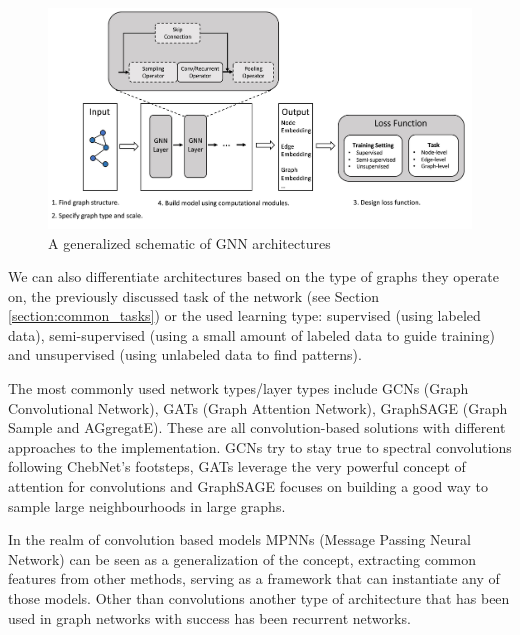 	 \begin{figure}[!h]
	 	\centering
	 	\includegraphics[width=\textwidth]{figures/gnn_general_structure.jpg}
	 	\caption{A generalized schematic of GNN architectures \cite{gnn_review}}
	 \end{figure}
	 
	 We can also differentiate architectures based on the type of graphs they operate on, the previously discussed task of the network (see Section \ref{section:common_tasks}) or the used learning type: supervised (using labeled data), semi-supervised (using a small amount of labeled data to guide training) and unsupervised (using unlabeled data to find patterns).
	 
	 The most commonly used network types/layer types include GCNs\cite{kipf2016semi} (Graph Convolutional Network), GATs\cite{gat_paper} (Graph Attention Network), GraphSAGE\cite{graphasge_paper} (Graph Sample and AGgregatE). These are all convolution-based solutions with different approaches to the implementation. GCNs try to stay true to spectral convolutions following ChebNet's footsteps, GATs leverage the very powerful concept of attention for convolutions and GraphSAGE focuses on building a good way to sample large neighbourhoods in large graphs.
	 
	 In the realm of convolution based models MPNNs\cite{gilmer2020message} (Message Passing Neural Network) can be seen as a generalization of the concept, extracting common features from other methods, serving as a framework that can instantiate any of those models. Other than convolutions another type of architecture that has been used in graph networks with success has been recurrent networks. 
	 
